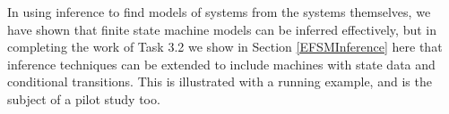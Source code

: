 In using inference to find models of systems from the systems themselves, we have shown that finite state machine models can be inferred effectively, but in completing the work of Task 3.2 we show in Section \ref{EFSMInference} here that inference techniques can be extended to include machines with state data and conditional transitions. This is illustrated with a running example, and is the subject of a pilot study too.






\clearpage
